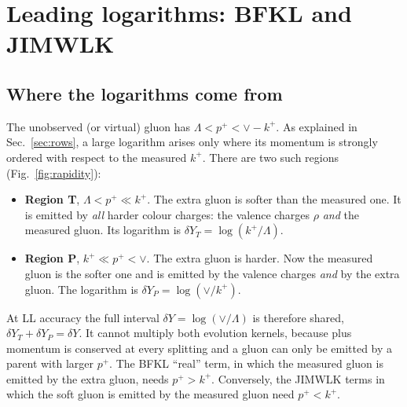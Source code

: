 \documentclass[aps,prd,onecolumn,superscriptaddress,nofootinbib,floatfix,longbibliography,11pt]{revtex4-2}
\numberwithin{equation}{section}
\begin{document}
\section{Leading logarithms: BFKL and JIMWLK}\label{sec:LL}

\subsection{Where the logarithms come from}\label{sec:LLorigin}

The unobserved (or virtual) gluon has $\Lambda<p^+<\vee-k^+$. As explained in Sec.~\ref{sec:rows}, a large logarithm arises only where its momentum is strongly ordered with respect to the measured $k^+$. There are two such regions (Fig.~\ref{fig:rapidity}):
\begin{itemize}
\item \textbf{Region T}, $\Lambda<p^+\ll k^+$. The extra gluon is softer than the measured one. It is emitted by \emph{all} harder colour charges: the valence charges $\rho$ \emph{and} the measured gluon. Its logarithm is $\delta Y_T=\log(k^+/\Lambda)$.
\item \textbf{Region P}, $k^+\ll p^+<\vee$. The extra gluon is harder. Now the measured gluon is the softer one and is emitted by the valence charges \emph{and} by the extra gluon. The logarithm is $\delta Y_P=\log(\vee/k^+)$.
\end{itemize}
At LL accuracy the full interval $\delta Y=\log(\vee/\Lambda)$ is therefore shared, $\delta Y_T+\delta Y_P=\delta Y$. It cannot multiply both evolution kernels, because plus momentum is conserved at every splitting and a gluon can only be emitted by a parent with larger $p^+$. The BFKL ``real'' term, in which the measured gluon is emitted by the extra gluon, needs $p^+>k^+$. Conversely, the JIMWLK terms in which the soft gluon is emitted by the measured gluon need $p^+<k^+$.
\end{document}
